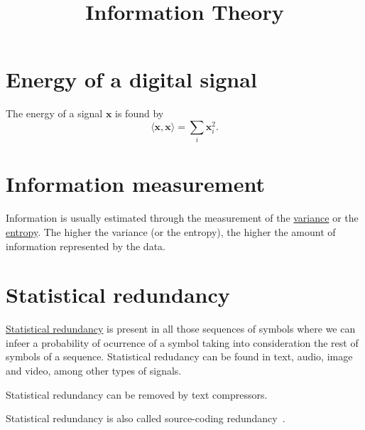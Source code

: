 
\title{Information Theory}
\maketitle
\tableofcontents

\section{Energy of a digital signal}
The energy of a signal ${\mathbf x}$ is found by
\begin{equation}
  \langle {\mathbf x}, {\mathbf x}\rangle =  \sum_{i}{{\mathbf x}_i^2}.
\end{equation}

\section{Information measurement}
Information is usually estimated through the measurement of the
\href{https://en.wikipedia.org/wiki/Variance}{variance} or the
\href{https://en.wikipedia.org/wiki/Entropy}{entropy}. The higher the
variance (or the entropy), the higher the amount of information
represented by the data.

\section{Statistical redundancy}
\href{https://en.wikipedia.org/wiki/Redundancy_(information_theory)}{Statistical
  redundancy} is present in all those sequences of symbols where we
can infeer a probability of ocurrence of a symbol taking into
consideration the rest of symbols of a sequence. Statistical redudancy
can be found in text, audio, image and video, among other types of
signals.

Statistical redundancy can be removed by text compressors.

Statistical redundancy is also called source-coding redundancy~\cite{kondoz2009visual}.

